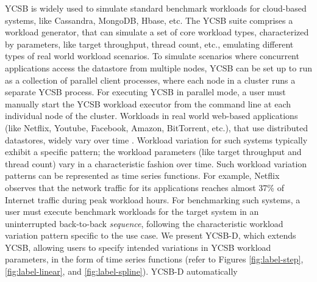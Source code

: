 \documentclass[conference]{IEEEtran}
\begin{document}
YCSB \cite{Cooper:2010:BCS:1807128.1807152} is widely used to simulate standard benchmark workloads for cloud-based systems, like Cassandra, MongoDB, Hbase, etc. %
           The YCSB suite comprises a workload generator, that can simulate a set of core workload types, characterized by parameters, like target throughput, thread count, etc., emulating different types of real world workload scenarios.
             To simulate scenarios where concurrent applications access the datastore from multiple nodes, YCSB can be set up to run as a collection of parallel client processes, where each node in a cluster runs a separate YCSB process. For executing YCSB in parallel mode, a user must manually start the YCSB workload executor from the command line at each individual node of the cluster. %
              Workloads in real world web-based applications (like Netflix, Youtube, Facebook, Amazon, BitTorrent, etc.), that use distributed datastores, widely vary over time \cite{NetflixWorkload-Variation}. Workload variation for such systems typically exhibit a specific pattern; the workload parameters (like target throughput and thread count) vary in a characteristic fashion over time.
              Such workload variation patterns can be represented as time series functions.
              For example, Netflix \cite{NetflixWorkload-Variation} observes that the network traffic for its applications reaches almost 37\% of Internet traffic during peak workload hours.
             For benchmarking such systems, a user must execute benchmark workloads for the
            target system in an uninterrupted back-to-back \emph{sequence}, following the characteristic workload variation pattern specific to the use case.
           We present YCSB-D, which extends YCSB, allowing users to specify intended variations in YCSB workload parameters,
            in the form of time series functions (refer to Figures \ref{fig:label-step}, \ref{fig:label-linear}, and \ref{fig:label-spline}). YCSB-D automatically
\end{document}
